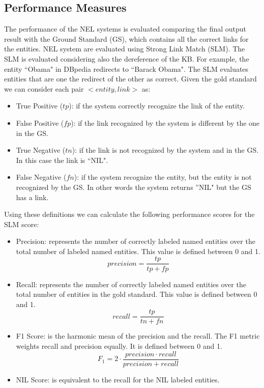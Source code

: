 \subsection{Performance Measures}
The performance of the NEL systems is evaluated comparing the final output result with the Ground Standard (GS), which contains all the correct links for the entities. 
NEL system are evaluated using Strong Link Match (SLM). The SLM is evaluated considering also the dereference of the KB. For example, the entity ``Obama" in DBpedia redirects to ``Barack Obama". The SLM evaluates entities that are one the redirect of the other as correct. Given the gold standard we can consider each pair \(<\!entity, link\!>\) as:
\begin{itemize}[itemsep = 0.1em]
\item True Positive (\(tp\)): if the system correctly recognize the link of the entity.
\item False Positive (\(fp\)): if the link recognized by the system is different by the one in the GS.
\item True Negative (\(tn\)): if the link is not recognized by the system and in the GS. In this case the link is ``NIL".
\item False Negative (\(fn\)): if the system recognize the entity, but the entity is not recognized by the GS. In other words the system returns ''NIL" but the GS has a link.
\end{itemize} 

Using these definitions we can calculate the following performance scores for the SLM score:
\begin{itemize}[itemsep = 0.1em]
\item Precision: represents the number of correctly labeled named entities over the total number of labeled named entities. This value is defined between 0 and 1.
\begin{equation}
precision = \frac{tp}{tp+fp}
\end{equation}

\item Recall: represents the number of correctly labeled named entities over the total number of entities in the gold standard. This value is defined between 0 and 1.
\begin{equation}
recall = \frac{tp}{tn+fn}
\end{equation}
\item F1 Score: is the harmonic mean of the precision and the recall. The F1 metric weights recall and precision equally. It is defined between 0 and 1. 
\begin{equation}
F_1 = 2 \cdot \frac{precision \cdot recall}{precision+recall}
\end{equation}
\item NIL Score: is equivalent to the recall for the NIL labeled entities.
\end{itemize}	


